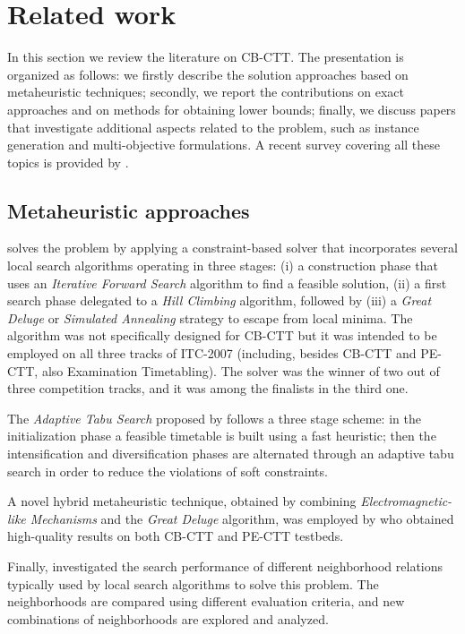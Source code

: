 \documentclass[authoryear,12pt]{article}
\newcommand{\cbctt}{CB-CTT}
\newcommand{\pectt}{PE-CTT}
\begin{document}
\section{Related work}

In this section we review the literature on \cbctt{}.  The presentation is
organized as follows: we firstly describe the solution approaches based on
metaheuristic techniques; secondly, we report the contributions on exact
approaches and on methods for obtaining lower bounds; finally, we discuss papers
that investigate additional aspects related to the problem, such as instance
generation and multi-objective formulations.  A recent survey covering all these
topics is provided by \cite{BCRT15}.

\subsection{Metaheuristic approaches}

\cite{Mull09} solves the problem by applying a constraint-based solver that
incorporates several local search algorithms operating in three stages: (i) a
construction phase that uses an \emph{Iterative Forward Search} algorithm to
find a feasible solution, (ii) a first search phase delegated to a \emph{Hill
Climbing} algorithm, followed by (iii) a \emph{Great Deluge} or \emph{Simulated
Annealing} strategy to escape from local minima.
%
The algorithm was not specifically designed for \cbctt{} but it was intended to
be employed on all three tracks of ITC-2007 (including, besides \cbctt{} and
\pectt{}, also Examination Timetabling). The solver was the winner of two out of
three competition tracks, and it was among the finalists in the third one.

The \emph{Adaptive Tabu Search} proposed by \cite{LuHa09} follows a three stage
scheme: in the initialization phase a feasible timetable is built using a fast
heuristic; then the intensification and diversification phases are alternated
through an adaptive tabu search in order to reduce the violations of soft
constraints.

A novel hybrid metaheuristic technique, obtained by combining
\emph{Electro\-magne\-tic-like Mechanisms} and the \emph{Great Deluge}
algorithm, was employed by \cite{ATMM10} who obtained high-quality results on
both \cbctt{} and \pectt{} testbeds.

Finally, \cite{LuJG11} investigated the search performance of different
neighborhood relations typically used by local search algorithms to solve this
problem. The neighborhoods are compared using different evaluation criteria, and
new combinations of neighborhoods are explored and analyzed.
\end{document}
